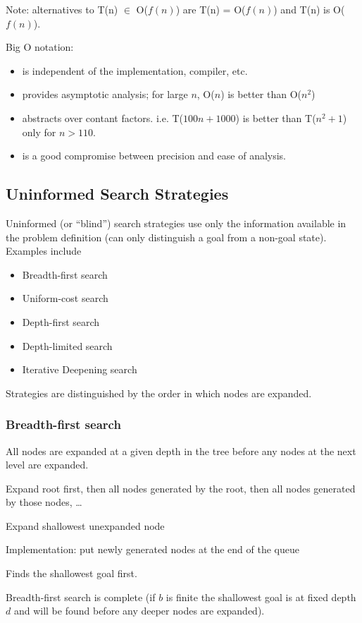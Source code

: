 Note: alternatives to T(n) $\in$ O($f(n)$) are T(n) = O($f(n)$) and T(n) is
O($f(n)$).

Big O notation:
\begin{itemize}
    \item is independent of the implementation, compiler, etc.
    \item provides asymptotic analysis; for large $n$, O($n$) is better than O($n^2$)
    \item abstracts over contant factors. i.e. T($100n + 1000$) is better than
    T($n^2 + 1$) only for $n > 110$.
    \item is a good compromise between precision and ease of analysis.
\end{itemize}

\subsection{Uninformed Search Strategies}
Uninformed (or ``blind'') search strategies use only the information available in
the problem definition (can only distinguish a goal from a non-goal state).
Examples include
\begin{itemize}
    \item Breadth-first search
    \item Uniform-cost search
    \item Depth-first search
    \item Depth-limited search
    \item Iterative Deepening search
\end{itemize}
Strategies are distinguished by the order in which nodes are expanded.

\subsubsection{Breadth-first search}
All nodes are expanded at a given depth in the tree before any nodes at the
next level are expanded.

Expand root first, then all nodes generated by the root, then all nodes
generated by those nodes, \ldots

Expand shallowest unexpanded node

Implementation: put newly generated nodes at the end of the queue

Finds the shallowest goal first.

Breadth-first search is complete (if $b$ is finite the shallowest goal is at
fixed depth $d$ and will be found before any deeper nodes are expanded).

